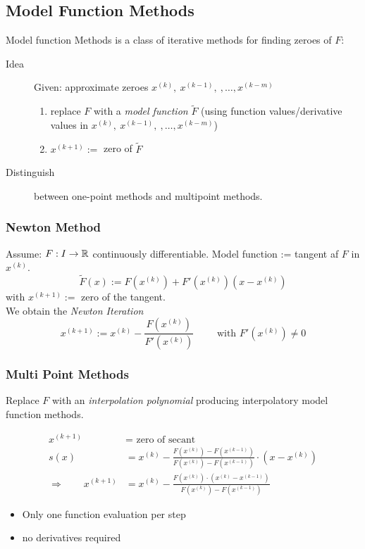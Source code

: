	\subsection{Model Function Methods}
	Model function Methods is a class of iterative methods for finding zeroes of $F$: 
	\begin{description}
	 \item[Idea] Given: approximate zeroes $x^{(k)}, \ x^{(k-1)}, \ , \ldots, x^{(k-m)}$
		\begin{enumerate}
		 \item replace $F$ with a \emph{model function} $\tilde F$ (using function values/derivative values in  $x^{(k)}, \ x^{(k-1)}, \ , \ldots, x^{(k-m)}$)
		 \item $x^{(k+1)}:=$ zero of $\tilde F$ 
		\end{enumerate}
	 \item[Distinguish] between one-point methods and multipoint methods.
	\end{description}
		\subsubsection{Newton Method}
			Assume: $F:I \rightarrow \mathbb{R}$ continuously differentiable. Model function := tangent af $F$ in $x^{(k)}$.
			\[
			 \tilde F(x):= F\left(x^{(k)}\right) +  F'\left(x^{(k)}\right)\left(x-x^{(k)}\right)
			\]
			with $x^{(k+1)} :=$ zero of the tangent.\\
			
			We obtain the \emph{Newton Iteration}
			\[
			 x^{(k+1)}:= x^{(k)} - \frac{F\left(x^{(k)}\right)}{F'\left(x^{(k)}\right)} \qquad \text{ with } F' \left(x^{(k)}\right) \neq 0
			\]
		\subsubsection{Multi Point Methods}
			Replace $F$ with an \emph{interpolation polynomial} producing interpolatory model function methods.
			\begin{notice}
				\begin{align*}
				 x^{(k+1)} &= \text{ zero of secant}\\
				 s(x) &= x^{(k)} - \frac{F(x^{(k)})-F(x^{(k-1)})}{F(x^{(k)})-F(x^{(k-1)})}\cdot (x-x^{(k)})\\
				 \Longrightarrow \qquad x^{(k+1)}&= x^{(k)}- \frac{F(x^{(k)})\cdot(x^{(k)}-x^{(k-1)})}{F(x^{(k)})-F(x^{(k-1)})}
				\end{align*}
				\begin{itemize}
				 \item Only one function evaluation per step
				 \item no derivatives required
				\end{itemize}
			\end{notice}
